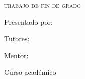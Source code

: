
\begin{titlepage}
  \AddToShipoutPicture*{\BackgroundPic}

  \begin{addmargin}[2.575cm]{0cm}
  \begin{flushleft}
    \Large  
    \hfill\vfil

    \large{\textsf{\miFacultad}}

    \vfill

    {\large\textsc\miGrado} \vfill


    {\large\textsc{trabajo de fin de grado}}

    \begin{flushleft}
      \Huge
      \miTitulo
    \end{flushleft}

    \vfill\vfill\vfill\vfill

    \textsf{\normalsize{Presentado por:}}\\
    {\normalsize\textrm{\miNombre}} 
    \bigskip

    \textsf{\normalsize{Tutores:}}\\
    {\normalsize\rmfamily\miTutor}
    \bigskip

    \textsf{\normalsize{Mentor:}}\\
    {\normalsize\rmfamily\miMentor}


    \bigskip
    \textsf{\normalsize{Curso académico \miCurso}}
  \end{flushleft}  
  \end{addmargin}       

\end{titlepage}   
\cleardoublepage
\endinput
